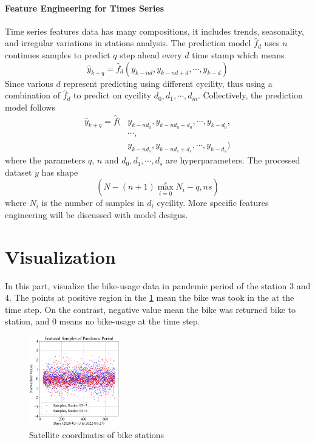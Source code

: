 \paragraph{Feature Engineering for Times Series}\label{sec:FeatureEngineerforTimeSeries}
Time series features data has many compositions, it includes 
trends, seasonality, and irregular variations in 
stations analysis. 
The prediction model $\widehat{f}_d$ uses $n$ continues samples to predict 
$q$ step ahead every $d$ time stamp which means 
\[
    \widehat{y}_{k+q} = \widehat{f}_d(y_{k-nd}, y_{k-nd+d}, \cdots, y_{k-d})
\] 
Since various $d$ represent predicting using different cycility, thus using
a combination of $\widehat{f}_d$ to
predict on cycility $d_0,d_1, \cdots, d_m$. Collectively, the prediction model follows
\begin{align*}
    \widehat{y}_{k+q} = 
    \widehat{f}
    (&y_{k-nd_0}, y_{k-nd_0+d_0}, \cdots, y_{k-d_0}, 
    \\ &\cdots,\\
    &y_{k-nd_s}, y_{k-nd_s+d_s}, \cdots, y_{k-d_s})
\end{align*}
where the parameters $q$, $n$ and $d_0,d_1, \cdots, d_s$ are hyperparameters. 
The processed dataset $y$ has shape
\[
    \left(
        N-(n+1)\max_{i = 0}^{s}
        N_i -q
        , 
        ns
        \right)
\]
where $N_i$ is the number of samples in $d_i$ cycility.
More specific features engineering will be discussed with model designs.

\section{Visualization}
In this part, visualize the bike-usage data in pandemic period of the 
station $3$ and $4$. 
The points at positive region in the \ref{FIGURES: FEATURED DATA} 
mean the bike was took in the at the time step. 
On the contrast, negative value mean the bike was returned bike to station, and 
$0$ means no bike-usage at the time step.
\begin{figure}[H]
    \centering
    \includegraphics[width=0.35\textwidth]{chap/fig-1.png}
    \caption{
        \footnotesize
        Satellite coordinates of bike stations
        } %
    \label{FIGURES: FEATURED DATA}
\end{figure}
